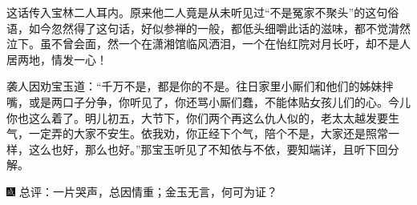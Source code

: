 这话传入宝林二人耳内。原来他二人竟是从未听见过``不是冤家不聚头''的这句俗语，如今忽然得了这句话，好似参禅的一般，都低头细嚼此话的滋味，都不觉潸然泣下。虽不曾会面，然一个在潇湘馆临风洒泪，一个在怡红院对月长吁，却不是人居两地，情发一心！

袭人因劝宝玉道：``千万不是，都是你的不是。往日家里小厮们和他们的姊妹拌嘴，或是两口子分争，你听见了，你还骂小厮们蠢，不能体贴女孩儿们的心。今儿你也这么着了。明儿初五，大节下，你们两个再这么仇人似的，老太太越发要生气，一定弄的大家不安生。依我劝，你正经下个气，陪个不是，大家还是照常一样，这么也好，那么也好。''那宝玉听见了不知依与不依，要知端详，且听下回分解。

{\includegraphics[width=3mm]{../Images/00005}  \kaishu 总评：一片哭声，总因情重；金玉无言，何可为证？}
